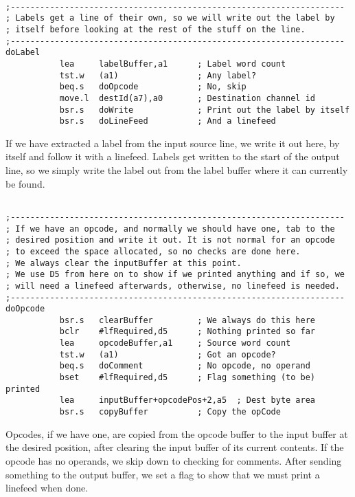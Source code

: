 \begin{lstlisting}[firstnumber=last,caption={ASMReformat Source - Writing Labels}]

;--------------------------------------------------------------------
; Labels get a line of their own, so we will write out the label by
; itself before looking at the rest of the stuff on the line.
;--------------------------------------------------------------------
doLabel
           lea     labelBuffer,a1      ; Label word count
           tst.w   (a1)                ; Any label?
           beq.s   doOpcode            ; No, skip
           move.l  destId(a7),a0       ; Destination channel id
           bsr.s   doWrite             ; Print out the label by itself
           bsr.s   doLineFeed          ; And a linefeed
\end{lstlisting}

If we have extracted a label from the input source line, we write it out here, by itself and follow it with a linefeed. Labels get written to the start of the output line, so we simply write the label out from the label buffer where it can currently be found.

\begin{lstlisting}[firstnumber=last,caption={ASMReformat Source - Writing Opcodes}]

;--------------------------------------------------------------------
; If we have an opcode, and normally we should have one, tab to the
; desired position and write it out. It is not normal for an opcode
; to exceed the space allocated, so no checks are done here.
; We always clear the inputBuffer at this point.
; We use D5 from here on to show if we printed anything and if so, we
; will need a linefeed afterwards, otherwise, no linefeed is needed.
;--------------------------------------------------------------------
doOpcode
           bsr.s   clearBuffer         ; We always do this here
           bclr    #lfRequired,d5      ; Nothing printed so far
           lea     opcodeBuffer,a1     ; Source word count
           tst.w   (a1)                ; Got an opcode?
           beq.s   doComment           ; No opcode, no operand
           bset    #lfRequired,d5      ; Flag something (to be) printed
           lea     inputBuffer+opcodePos+2,a5  ; Dest byte area
           bsr.s   copyBuffer          ; Copy the opCode
\end{lstlisting}

Opcodes, if we have one, are copied from the opcode buffer to the input buffer at the desired position, after clearing the input buffer of its current contents. If the opcode has no operands, we skip down to checking for comments. After sending something to the output buffer, we set a flag to show that we must print a linefeed when done.


